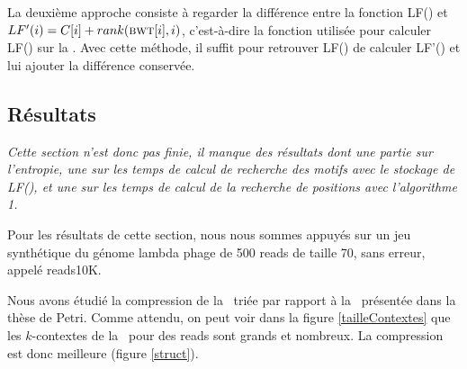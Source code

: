 La deuxième approche consiste à regarder la différence entre la fonction LF() et $LF'(i) = C[i] + rank(\textsc{bwt}[i], i)$, c'est-à-dire la fonction utilisée pour calculer LF() sur la \bwt. Avec cette méthode, il suffit pour retrouver LF() de calculer LF'() et lui ajouter la différence conservée.



%

%
%
%

\subsection{Résultats} 

\textit{Cette section n'est donc pas finie, il manque des résultats dont une partie sur l'entropie, une sur les temps de calcul de recherche des motifs avec le stockage de LF(), et une sur les temps de calcul de la recherche de positions avec l'algorithme 1.}

Pour les résultats de cette section, nous nous sommes appuyés sur un jeu synthétique du génome lambda phage de 500 reads de taille 70, sans erreur, appelé reads10K.

Nous avons étudié la compression de la \kbwt\ triée par rapport à la \kbwt\ présentée dans la thèse de Petri. Comme attendu, on peut voir dans la figure \ref{tailleContextes} que les $k$-contextes de la \kbwt\ pour des reads sont grands et nombreux. La compression est donc meilleure (figure \ref{struct}).

